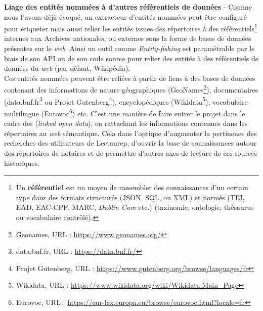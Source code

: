 \newpage
\textbf{Liage des entités nommées à d'autres référentiels de données} - Comme nous l'avons déjà évoqué, un extracteur d'entités nommées peut être configuré pour étiqueter mais aussi relier les entités issues des répertoires à des référentiels\footnote{Un \textbf{référentiel} est un moyen de rassembler des connaissances d'un certain type dans des formats structurés (JSON, SQL, ou XML) et normés (TEI, EAD, EAC-CPF, MARC, \textit{Dublin Core} etc.) (taxinomie, ontologie, thésaurus ou vocabulaire contrôlé).} internes aux Archives nationales, ou externes sous la forme de bases de données présentes sur le \textit{web}. Ainsi un outil comme \textit{Entity-fishing} est paramétrable par le biais de son API ou de son code source pour relier des entités à des référentiels de données du \textit{web} (par défaut, Wikipédia).\\ 

Ces entités nommées peuvent être reliées à partir de liens à des bases de données contenant des informations de nature géographiques (GeoNames\footnote{Geonames, URL : \url{https://www.geonames.org/}}), documentaires (data.bnf.fr\footnote{data.bnf.fr, URL : \url{https://data.bnf.fr/}} ou Projet Gutenberg\footnote{Projet Gutenberg, URL : \url{https://www.gutenberg.org/browse/languages/fr}}), encyclopédiques (Wikidata\footnote{Wikidata, URL : \url{https://www.wikidata.org/wiki/Wikidata:Main_Page}}), vocabulaire multilingue (Eurovoc\footnote{Eurovoc, URL : \url{https://eur-lex.europa.eu/browse/eurovoc.html?locale=fr}}) etc. C'est une manière de faire entrer le projet dans le cadre des  (\textit{linked open data}), en rattachant les informations contenues dans les répertoires au \textit{web} sémantique. Cela dans l'optique d'augmenter la pertinence des recherches des utilisateurs de Lectaurep, d'ouvrir la base de connaissances autour des répertoires de notaires et de permettre d'autres axes de lecture de ces sources historiques.\\

